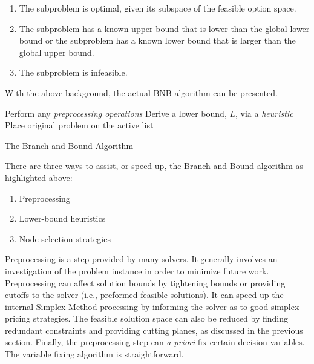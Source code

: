 \begin{enumerate}
        \item The subproblem is optimal, given its subspace of the feasible
        option space.
        \item The subproblem has a known upper bound that is lower
        than the global lower bound or the subproblem has a known lower bound
        that is larger than the global upper bound.
        \item The subproblem is infeasible.
\end{enumerate}

With the above background, the actual BNB algorithm can be presented.
\\
\begin{algorithm}[H]
 \SetAlgoLined
 Perform any \emph{preprocessing operations}\;
 Derive a lower bound, $L$, via a \emph{heuristic}\;
 Place original problem on the active list\;
 \caption{The Branch and Bound Algorithm}
\end{algorithm}

There are three ways to assist, or speed up, the Branch and Bound algorithm as
highlighted above:
\begin{enumerate}
        \item Preprocessing
        \item Lower-bound heuristics
        \item Node selection strategies
\end{enumerate}

Preprocessing is a step provided by many solvers. It generally involves an
investigation of the problem instance in order to minimize future
work. Preprocessing can affect solution bounds by tightening bounds or providing
cutoffs to the solver (i.e., preformed feasible solutions). It can speed up the
internal Simplex Method processing by informing the solver as to good simplex
pricing strategies. The feasible solution space can also be reduced by finding
redundant constraints and providing cutting planes, as discussed in the previous
section. Finally, the preprocessing step can \textit{a priori} fix certain
decision variables. The variable fixing algorithm is straightforward.

